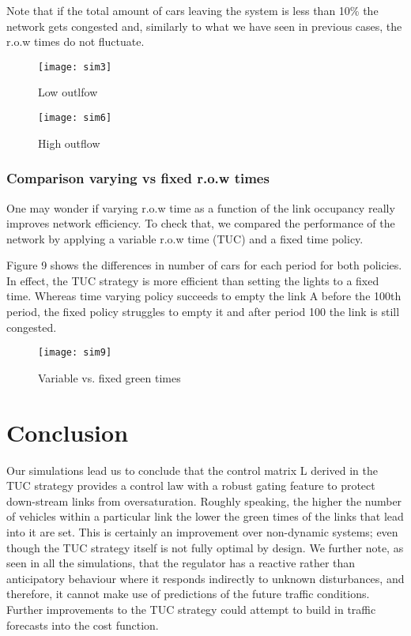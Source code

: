 \documentclass[11pt]{article}
\begin{document}
Note that if the total amount of cars leaving the system is less than 10\% the network gets congested and, similarly to what we have seen in previous cases, the r.o.w times do not fluctuate.

\begin{figure}[h!]
    \caption{Low outlfow}
      \centering
	\texttt{[image: sim3]}
\end{figure}

\begin{figure}[h!]
    \caption{High outflow}
      \centering
	\texttt{[image: sim6]}
\end{figure}

\subsubsection{Comparison varying vs fixed r.o.w times}

One may wonder if varying r.o.w time as a function of the link occupancy really improves network efficiency. To check that, we compared the performance of the network by applying a variable r.o.w time (TUC) and a fixed time policy. 

Figure 9 shows the differences in number of cars for each period for both policies. In effect, the TUC strategy is more efficient than setting the lights to a fixed time. Whereas time varying policy succeeds to empty the link A before the 100th period, the fixed policy struggles to empty it and after period 100 the link is still congested.

\begin{figure}[h!]
    \caption{Variable vs. fixed green times}
      \centering
	\texttt{[image: sim9]}
\end{figure}

\section{Conclusion}

Our simulations lead us to conclude that the control matrix L derived in the TUC strategy provides a control law with a robust gating feature to protect down-stream links from oversaturation. Roughly speaking, the higher the number of vehicles within a particular link the lower the green times of the links that lead into it are set. This is certainly an improvement over non-dynamic systems; even though the TUC strategy itself is not fully optimal by design. We further note, as seen in all the simulations, that the regulator has a reactive rather than anticipatory behaviour where it responds indirectly to unknown disturbances, and therefore, it cannot make use of predictions of the future traffic conditions. Further improvements to the TUC strategy could attempt to build in traffic forecasts into the cost function.
 \clearpage
\end{document}
